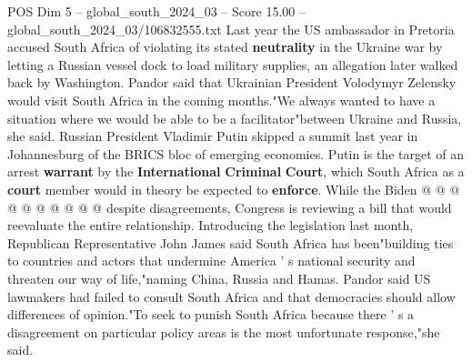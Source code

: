 \begin{textsample}{POS Dim 5 – global\_south\_2024\_03 – Score 15.00 – global\_south\_2024\_03/106832555.txt}
Last year the US ambassador in Pretoria accused South Africa of violating its stated \textbf{neutrality} in the Ukraine war by letting a Russian vessel dock to load military supplies, an allegation later walked back by Washington.
Pandor said that Ukrainian President Volodymyr Zelensky would visit South Africa in the coming months."We always wanted to have a situation where we would be able to be a facilitator"between Ukraine and Russia, she said.
Russian President Vladimir Putin skipped a summit last year in Johannesburg of the BRICS bloc of emerging economies.
Putin is the target of an arrest \textbf{warrant} by the \textbf{International} \textbf{Criminal} \textbf{Court}, which South Africa as a \textbf{court} member would in theory be expected to \textbf{enforce}.
While the Biden @ @ @ @ @ @ @ @ @ @ despite disagreements, Congress is reviewing a bill that would reevaluate the entire relationship.
Introducing the legislation last month, Republican Representative John James said South Africa has been"building ties to countries and actors that undermine America ' s national security and threaten our way of life,"naming China, Russia and Hamas.
Pandor said US lawmakers had failed to consult South Africa and that democracies should allow differences of opinion."To seek to punish South Africa because there ' s a disagreement on particular policy areas is the most unfortunate response,"she said.

\end{textsample}
